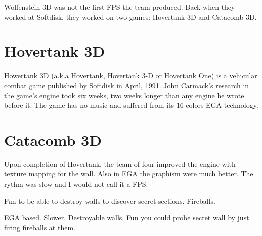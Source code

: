 Wolfenstein 3D was not the first FPS the team produced. Back when they worked at Softdisk, they worked on two games: Hovertank 3D and Catacomb 3D.\\
\par
\section{Hovertank 3D}
Howertank 3D (a.k.a Hovertank, Hovertank 3-D or Hovertank One)  is a vehicular combat game published by Softdisk in April, 1991. John Carmack's research in the game's engine took six weeks, two weeks longer than any engine he wrote before it. The game has no music and suffered from its 16 colors EGA technology.\\
\par
{}
\begin{figure}[H]
\centering
{}
\end{figure}

\begin{figure}[H]
\centering
{}
\end{figure}



\section{Catacomb 3D}
Upon completion of Hovertank, the team of four improved the engine with texture mapping for the wall. Also in EGA the graphism were much better. The rythm was slow and I would not call it a FPS. \\
\par
{}
\begin{figure}[H]
\centering
{}
\end{figure}

Fun to be able to destroy walls to discover secret sections. Fireballs.

\begin{figure}[H]
\centering
{}
\end{figure}

EGA based. Slower. Destroyable walls. Fun you could probe secret wall by just firing fireballs at them.



